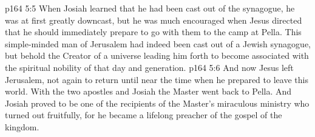 \vs p164 5:5 When Josiah learned that he had been cast out of the synagogue, he was at first greatly downcast, but he was much encouraged when Jesus directed that he should immediately prepare to go with them to the camp at Pella. This simple\hyp{}minded man of Jerusalem had indeed been cast out of a Jewish synagogue, but behold the Creator of a universe leading him forth to become associated with the spiritual nobility of that day and generation.
\vs p164 5:6 And now Jesus left Jerusalem, not again to return until near the time when he prepared to leave this world. With the two apostles and Josiah the Master went back to Pella. And Josiah proved to be one of the recipients of the Master’s miraculous ministry who turned out fruitfully, for he became a lifelong preacher of the gospel of the kingdom.
